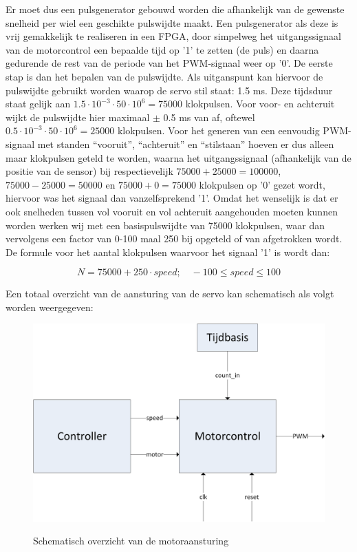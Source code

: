\documentclass{report}
\begin{document}
Er moet dus een pulsgenerator gebouwd worden die afhankelijk van de gewenste snelheid per wiel een geschikte pulswijdte maakt.
Een pulsgenerator als deze is vrij gemakkelijk te realiseren in een FPGA, door simpelweg het uitgangssignaal van de motorcontrol een bepaalde tijd op '1' te zetten (de puls) en daarna gedurende de rest van de periode van het PWM-signaal weer op '0'.
De eerste stap is dan het bepalen van de pulswijdte.
Als uitganspunt kan hiervoor de pulswijdte gebruikt worden waarop de servo stil staat: 1.5 ms.
Deze tijdsduur staat gelijk aan $1.5 \cdot 10^{-3} \cdot 50 \cdot 10^{6} = 75000$ klokpulsen.
Voor voor- en achteruit wijkt de pulswijdte hier maximaal $\pm$ 0.5 ms van af, oftewel $0.5 \cdot 10^{-3} \cdot 50 \cdot 10^{6} = 25000$ klokpulsen.
Voor het generen van een eenvoudig PWM-signaal met standen ``vooruit'', ``achteruit'' en ``stilstaan'' hoeven er dus alleen maar klokpulsen geteld te worden, waarna het uitgangssignaal (afhankelijk van de positie van de sensor) bij respectievelijk $75000 + 25000 = 100000$, $75000 - 25000 = 50000$ en $75000 + 0 = 75000$ klokpulsen op '0' gezet wordt, hiervoor was het signaal dan vanzelfsprekend '1'.
Omdat het wenselijk is dat er ook snelheden tussen vol vooruit en vol achteruit aangehouden moeten kunnen worden werken wij met een basispulswijdte van 75000 klokpulsen, waar dan vervolgens een factor van 0-100 maal 250 bij opgeteld of van afgetrokken wordt.
De formule voor het aantal klokpulsen waarvoor het signaal '1' is wordt dan:

\begin{equation}
	\label{eq:pulsewidth}
	N = 75000 + 250 \cdot speed;\quad -100 \leq speed \leq 100
\end{equation}

Een totaal overzicht van de aansturing van de servo kan schematisch als volgt worden weergegeven:

\begin{figure}[H]
	\includegraphics[width=\textwidth]{resource/motor-control}
	\label{fig:motorcontrol}
	\caption{Schematisch overzicht van de motoraansturing}
\end{figure}
\end{document}
